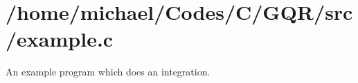 \section{/home/michael/Codes/C/GQR/src/example.c}
An example program which does an integration.


\begin{DoxyCodeInclude}
\end{DoxyCodeInclude}
 